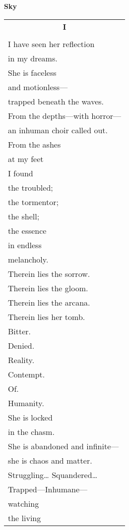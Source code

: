 \documentclass{article}
\begin{document}
\newcommand{\h}{\hspace*{2ex}}
\newcommand{\HHHH}{\hspace*{32ex}}
\begin{center}
{\large\textbf{Sky}} \\
\begin{tabular}{l}
\multicolumn{1}{c}{\large\textbf{I}} \\
\\
I have seen her reflection \\
\h in my dreams. \\
She is faceless \\
\h and motionless--- \\
\h\h trapped beneath the waves. \\ %
From the depths---with horror--- \\
\h an inhuman choir called out. \\ %
From the ashes \\
\h at my feet \\
\h\h I found \\
the troubled; \\
\h the tormentor; \\
\h\h the shell; \\
\h\h\h the essence \\ %
in endless \\
\h melancholy.\\
Therein lies the sorrow. \\
Therein lies the gloom. \\
Therein lies the arcana. \\
Therein lies her tomb. \\
\h Bitter. \\
\h\h Denied. \\
\h\h\h Reality. \\
\h Contempt. \\
\h\h Of. \\
\h\h\h Humanity. \\
She is locked \\
\h in the chasm. \\
She is abandoned and infinite--- \\
\h she is chaos and matter. \\ %
Struggling\ldots{} Squandered\ldots \\
\h Trapped---Inhumane--- \\
\h\h watching \\
\h\h\h the living \\

\end{tabular}
\end{center}
\end{document}
